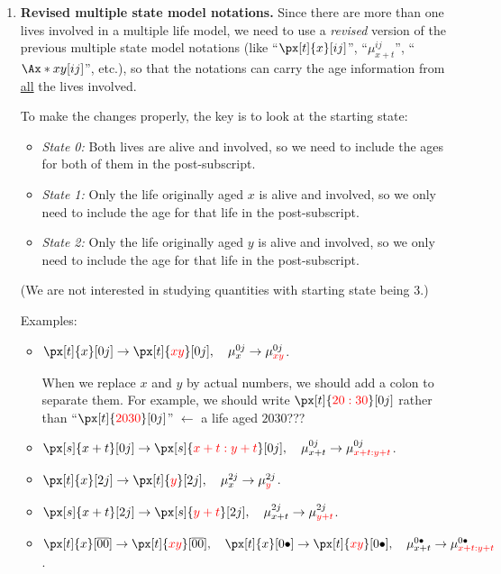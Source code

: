 \begin{enumerate}
\item\label{it:revised-mult-state-notations} \textbf{Revised multiple state
model notations.} Since there are more than one lives involved in a multiple
life model, we need to use a \emph{revised} version of the previous multiple
state model notations (like ``\(\px[t]{x}[ij]\)'', ``\(\mu_{x+t}^{ij}\)'',
``\(\Ax*{xy}[ij]\)'', etc.), so that the notations can carry the age information
from \underline{all} the lives involved.

To make the changes properly, the key  is to look at the starting state:
\begin{itemize}
\item \emph{State 0:} Both lives are alive and involved, so we need to include
the ages for both of them in the post-subscript.
\item \emph{State 1:} Only the life originally aged \(x\) is alive and
involved, so we only need to include the age for that life in the post-subscript.
\item \emph{State 2:} Only the life originally aged \(y\) is alive and
involved, so we only need to include the age for that life in the post-subscript.
\end{itemize}
(We are not interested in studying quantities with starting state being 3.)

Examples:
\begin{itemize}
\item \(\px[t]{x}[0j]\to\px[t]{\rc{xy}}[0j],\quad\mu_{x}^{0j}\to\mu_{\rc{xy}}^{0j}\).

\begin{note}
When we replace \(x\) and \(y\) by actual numbers, we should add a colon to
separate them. For example, we should write \(\px[t]{\rc{20:30}}[0j]\) rather
than ``\(\px[t]{\rc{2030}}[0j]\)'' \(\leftarrow\) a life aged \(2030\)???
\end{note}
\item \(\px[s]{x+t}[0j]\to\px[s]{\rc{x+t:y+t}}[0j],\quad\mu_{x+t}^{0j}\to\mu_{\rc{x+t:y+t}}^{0j}\).
\item \(\px[t]{x}[2j]\to\px[t]{\rc{y}}[2j],\quad\mu_{x}^{2j}\to\mu_{\rc{y}}^{2j}\).
\item \(\px[s]{x+t}[2j]\to\px[s]{\rc{y+t}}[2j],\quad\mu_{x+t}^{2j}\to\mu_{\rc{y+t}}^{2j}\).

\item \(\px[t]{x}[\overline{00}]\to\px[t]{\rc{xy}}[\overline{00}],\quad
\px[t]{x}[0\bullet]\to\px[t]{\rc{xy}}[0\bullet],\quad
\mu_{x+t}^{0\bullet}\to\mu_{\rc{x+t:y+t}}^{0\bullet}\).


\end{itemize}
\end{enumerate}

